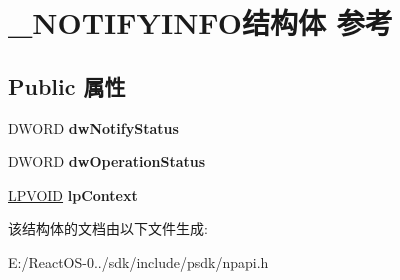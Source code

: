 \hypertarget{struct___n_o_t_i_f_y_i_n_f_o}{}\section{\+\_\+\+N\+O\+T\+I\+F\+Y\+I\+N\+F\+O结构体 参考}
\label{struct___n_o_t_i_f_y_i_n_f_o}
\subsection*{Public 属性}
\begin{DoxyCompactItemize}
\item 
\mbox{\label{struct___n_o_t_i_f_y_i_n_f_o_ad5a4fd662e2d56bdb9c9f730aa2f027b}} 
D\+W\+O\+RD {\bfseries dw\+Notify\+Status}
\item 
\mbox{\label{struct___n_o_t_i_f_y_i_n_f_o_a5c882d518f73d7b274381b20f2132238}} 
D\+W\+O\+RD {\bfseries dw\+Operation\+Status}
\item 
\mbox{\label{struct___n_o_t_i_f_y_i_n_f_o_a851190c6c2a038098ec25fe7343d7c9c}} 
\hyperlink{interfacevoid}{L\+P\+V\+O\+ID} {\bfseries lp\+Context}
\end{DoxyCompactItemize}


该结构体的文档由以下文件生成\+:\begin{DoxyCompactItemize}
\item 
E\+:/\+React\+O\+S-\/0../sdk/include/psdk/npapi.\+h\end{DoxyCompactItemize}
